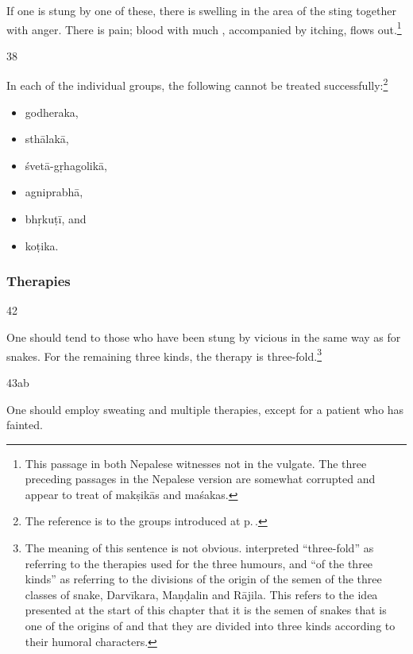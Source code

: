 \begin{translation}
If one is stung by one of these, there is swelling in the area of the sting together 
with anger. 
There is pain; blood with much , accompanied by
itching, flows out.\footnote{This passage in both Nepalese witnesses
    not in the vulgate.  The three preceding passages in the
    Nepalese version are somewhat corrupted and appear to treat of
    \glspl{makṣikā} and \glspl{maśaka}.}

\item[38]

In each of the individual groups, the following cannot be treated 
successfully:\footnote{The reference is to the groups introduced at 
p.\,\pageref{ekajati}.}
\begin{itemize}
    \item \Gls{godheraka},
    \item \Gls{sthālakā}, 
    \item \Gls{śvetā-gṛhagolikā},
    \item \Gls{agniprabhā},
    \item \Gls{bhṛkuṭī}, 
    and
    \item \Gls{koṭika}.
    \end{itemize}



\subsubsection{Therapies}

\item[42]

One should tend to those who have been stung by vicious
 in the same way as for snakes. For the remaining
three kinds, the therapy is three-fold.\footnote{The meaning of this
    sentence is not obvious.   interpreted
    “three-fold” as referring to the therapies used for the three humours,
    and “of the three kinds” as referring to the divisions of the origin
    of the semen of the three classes of snake, Darvīkara, Maṇḍalin and
    Rājila.  This refers to the idea presented at the start of this
    chapter that it is the semen of snakes that is one of the origins of
     and that they are divided into three kinds
    according to their humoral characters.}


\item[43ab]

One should employ sweating and multiple therapies, except for a patient who has 
fainted. 


\end{translation}
